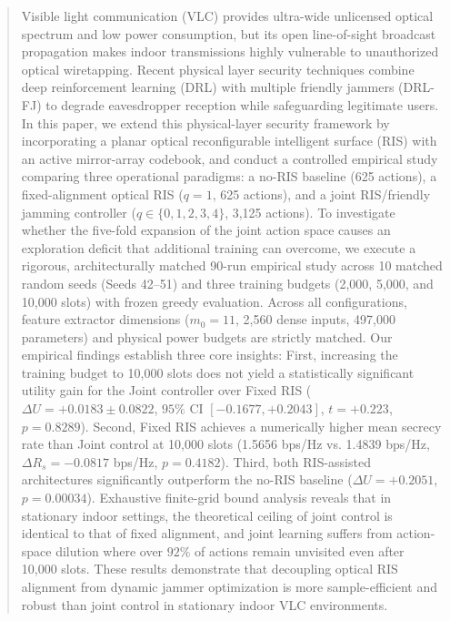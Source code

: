 \documentclass[journal,10pt,twocolumn]{IEEEtran}
\begin{document}
\begin{abstract}
Visible light communication (VLC) provides ultra-wide unlicensed optical spectrum and low power consumption, but its open line-of-sight broadcast propagation makes indoor transmissions highly vulnerable to unauthorized optical wiretapping. Recent physical layer security techniques combine deep reinforcement learning (DRL) with multiple friendly jammers (DRL-FJ) to degrade eavesdropper reception while safeguarding legitimate users. In this paper, we extend this physical-layer security framework by incorporating a planar optical reconfigurable intelligent surface (RIS) with an active mirror-array codebook, and conduct a controlled empirical study comparing three operational paradigms: a no-RIS baseline (625 actions), a fixed-alignment optical RIS ($q=1$, 625 actions), and a joint RIS/friendly jamming controller ($q \in \{0, 1, 2, 3, 4\}$, 3,125 actions). To investigate whether the five-fold expansion of the joint action space causes an exploration deficit that additional training can overcome, we execute a rigorous, architecturally matched 90-run empirical study across 10 matched random seeds (Seeds 42--51) and three training budgets (2,000, 5,000, and 10,000 slots) with frozen greedy evaluation. Across all configurations, feature extractor dimensions ($m_0=11$, 2,560 dense inputs, 497,000 parameters) and physical power budgets are strictly matched. Our empirical findings establish three core insights: First, increasing the training budget to 10,000 slots does not yield a statistically significant utility gain for the Joint controller over Fixed RIS ($\Delta U = +0.0183 \pm 0.0822$, $95\%$ CI $[-0.1677, +0.2043]$, $t = +0.223$, $p = 0.8289$). Second, Fixed RIS achieves a numerically higher mean secrecy rate than Joint control at 10,000 slots (1.5656 bps/Hz vs. 1.4839 bps/Hz, $\Delta R_s = -0.0817$ bps/Hz, $p = 0.4182$). Third, both RIS-assisted architectures significantly outperform the no-RIS baseline ($\Delta U = +0.2051$, $p = 0.00034$). Exhaustive finite-grid bound analysis reveals that in stationary indoor settings, the theoretical ceiling of joint control is identical to that of fixed alignment, and joint learning suffers from action-space dilution where over $92\%$ of actions remain unvisited even after 10,000 slots. These results demonstrate that decoupling optical RIS alignment from dynamic jammer optimization is more sample-efficient and robust than joint control in stationary indoor VLC environments.
\end{abstract}
\end{document}
